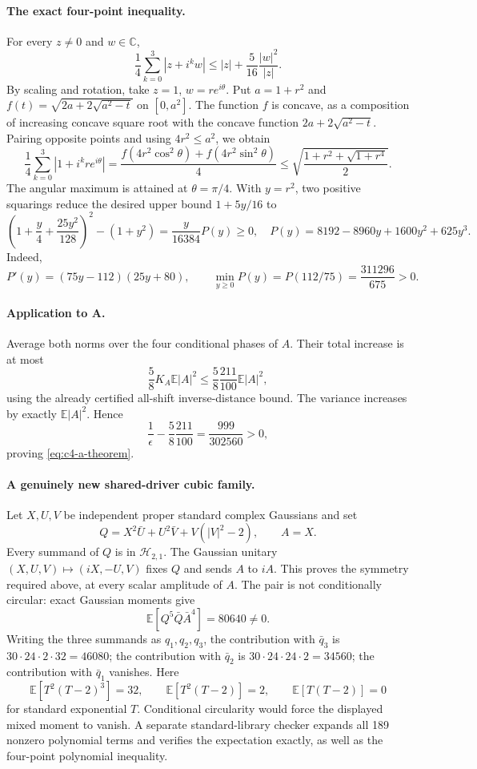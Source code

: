 \paragraph{The exact four-point inequality.}
For every $z\ne0$ and $w\in\mathbb C$,
\[
 \frac14\sum_{k=0}^3|z+i^kw|
 \le |z|+\frac5{16}\frac{|w|^2}{|z|}.
\]
By scaling and rotation, take $z=1$, $w=re^{i\theta}$. Put $a=1+r^2$ and
$f(t)=\sqrt{2a+2\sqrt{a^2-t}}$ on $[0,a^2]$. The function $f$ is
concave, as a composition of increasing concave square root with the
concave function $2a+2\sqrt{a^2-t}$. Pairing opposite points and using
$4r^2\le a^2$, we obtain
\[
 \frac14\sum_{k=0}^3|1+i^kre^{i\theta}|
 =\frac{f(4r^2\cos^2\theta)+f(4r^2\sin^2\theta)}4
 \le\sqrt{\frac{1+r^2+\sqrt{1+r^4}}2}.
\]
The angular maximum is attained at $\theta=\pi/4$. With $y=r^2$, two
positive squarings reduce the desired upper bound $1+5y/16$ to
\[
 \left(1+\frac y4+\frac{25y^2}{128}\right)^2-(1+y^2)
 =\frac{y}{16384}P(y)\ge0,
 \quad P(y)=8192-8960y+1600y^2+625y^3.
\]
Indeed,
\[
 P'(y)=(75y-112)(25y+80),\qquad
 \min_{y\ge0}P(y)=P(112/75)=\frac{311296}{675}>0.
\]

\paragraph{Application to A.}
Average both norms over the four conditional phases of $A$. Their total
increase is at most
\[
 \frac58 K_A\mathbb E|A|^2
 \le\frac58\frac{211}{100}\mathbb E|A|^2,
\]
using the already certified all-shift inverse-distance bound. The variance
increases by exactly $\mathbb E|A|^2$. Hence
\[
 \frac1\epsilon-\frac58\frac{211}{100}
 =\frac{999}{302560}>0,
\]
proving \eqref{eq:c4-a-theorem}.

\paragraph{A genuinely new shared-driver cubic family.}
Let $X,U,V$ be independent proper standard complex Gaussians and set
\[
 Q=X^2\bar U+U^2\bar V+V(|V|^2-2),\qquad A=X.
\]
Every summand of $Q$ is in $\mathcal H_{2,1}$. The Gaussian unitary
$(X,U,V)\mapsto(iX,-U,V)$ fixes $Q$ and sends $A$ to $iA$.
This proves the symmetry required above, at every scalar amplitude of $A$.
The pair is not conditionally circular: exact Gaussian moments give
\[
 \mathbb E[Q^5\bar Q\bar A^4]=80640\ne0.
\]
Writing the three summands as $q_1,q_2,q_3$, the contribution with
$\bar q_3$ is
$30\cdot24\cdot2\cdot32=46080$; the contribution with $\bar q_2$ is
$30\cdot24\cdot24\cdot2=34560$; the contribution with $\bar q_1$ vanishes.
Here
\[
 \mathbb E[T^2(T-2)^3]=32,\qquad
 \mathbb E[T^2(T-2)]=2,\qquad
 \mathbb E[T(T-2)]=0
\]
for standard exponential $T$. Conditional circularity would force the
displayed mixed moment to vanish. A separate standard-library checker
expands all 189 nonzero polynomial terms and verifies the expectation
exactly, as well as the four-point polynomial inequality.

